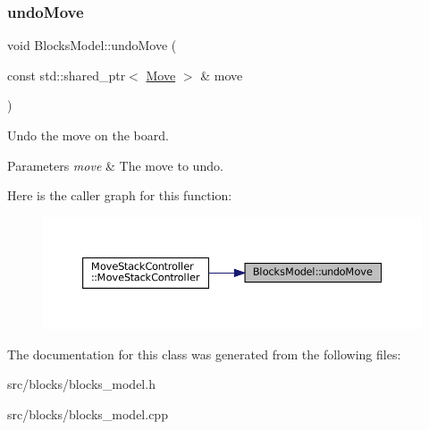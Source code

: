 \subsubsection{\texorpdfstring{undoMove}{undoMove}}
{\footnotesize\ttfamily void Blocks\+Model\+::undo\+Move (\begin{DoxyParamCaption}\item[{const std\+::shared\+\_\+ptr$<$ \mbox{\hyperlink{struct_move}{Move}} $>$ \&}]{move }\end{DoxyParamCaption})\hspace{0.3cm}{\ttfamily [slot]}}



Undo the move on the board. 


\begin{DoxyParams}{Parameters}
{\em move} & The move to undo. \\
\hline
\end{DoxyParams}
Here is the caller graph for this function\+:
\nopagebreak
\begin{figure}[H]
\begin{center}
\leavevmode
\includegraphics[width=350pt]{class_blocks_model_a6707a7dac44d269c2d52e7904a7473ef_icgraph}
\end{center}
\end{figure}


The documentation for this class was generated from the following files\+:\begin{DoxyCompactItemize}
\item 
src/blocks/blocks\+\_\+model.\+h\item 
src/blocks/blocks\+\_\+model.\+cpp\end{DoxyCompactItemize}
